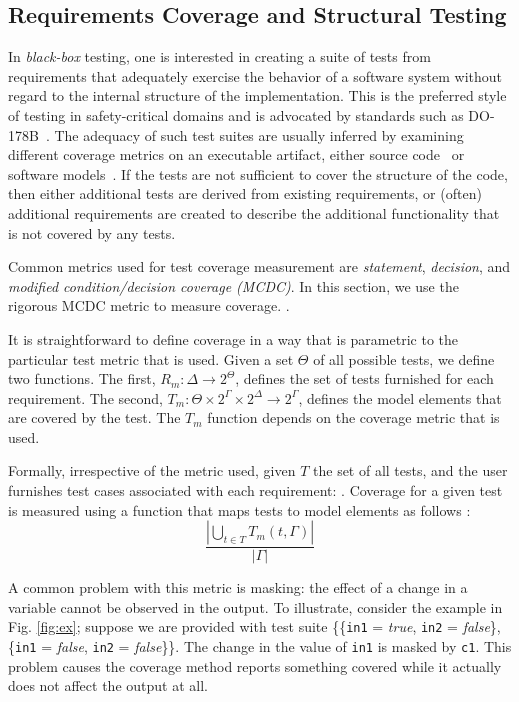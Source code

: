 \subsection{Requirements Coverage and Structural Testing}
In {\em black-box} testing, one is interested in creating a suite of tests from requirements that adequately exercise the behavior
of a software system without regard to the internal structure of the implementation.  This is the preferred style of testing in
safety-critical domains and is advocated by standards such as DO-178B~\cite{RTCA:DO-178B}.  The adequacy of such test suites are usually inferred by examining different coverage metrics on an executable artifact, either source code~\cite{Bezier90:TestingBook,MCDCPaper} or software models~\cite{Ammann99:SpecBasedCoverageMetric,Sanjai03:dissertation}.  If the tests are not sufficient to cover the structure of the code, then either additional tests are derived from existing requirements, or (often) additional requirements are created to describe the additional functionality that is not covered by any tests.  

Common metrics used for test coverage measurement are {\em statement}, {\em decision}, and {\em modified condition/decision coverage (MCDC)}.  In this section, we use the rigorous MCDC metric to measure coverage.  .  

It is straightforward to define coverage in a way that is parametric to the particular test metric that is used.  Given a set $\Theta$ of all possible tests, we define two functions.  The first, $R_m : \Delta \rightarrow 2^\Theta$, defines the set of tests furnished for each requirement.  The second, $T_m : \Theta \times 2^\Gamma \times 2^\Delta \rightarrow 2^\Gamma$, defines the model elements that are covered by the test.  The $T_m$ function depends on the coverage metric that is used.

Formally, irrespective of the metric used, given $T$ the set of all tests, and the user furnishes test cases associated with each requirement: . Coverage for a given test is measured using a function that maps tests to model elements  as follows \cite{chelenski1994oapplicability, schuler_assessing_2011, murugesan2015we}: $$\frac{|\bigcup_{t \in T} T_m (t, \Gamma)|}{|\Gamma|}$$




%
%

A common problem with this metric is masking:
the effect of a change in a variable cannot be observed in the output. To illustrate, consider the example in Fig. \ref{fig:ex}; suppose we are provided with
test suite \{\{{\tt in1} = \emph{true}, {\tt in2} = \emph{false}\},
\{{\tt in1} = \emph{false}, {\tt in2} = \emph{false}\}\}. The change in the value of
{\tt in1} is masked by {\tt c1}. This problem causes the coverage method reports something covered
while it actually does not affect the output at all.



